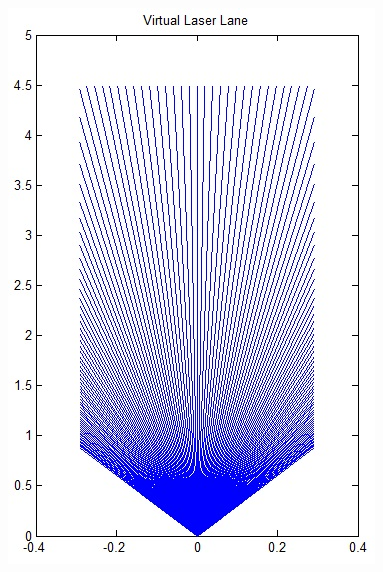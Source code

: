 \documentclass[noshadow]{LSRslides}
\begin{document}
\begin{frame}
\begin{columns}
	\centering
	\begin{figure}
      \includegraphics[scale=0.45]{virtual_lane.jpg} 
   \end{figure}	
\end{columns}


\end{frame}
\end{document}
